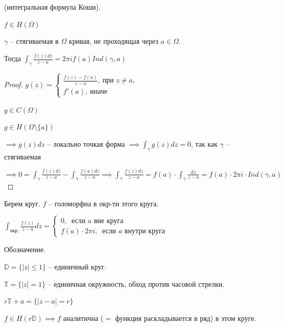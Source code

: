 \begin{theorem}
    (интегральная формула Коши).

    $f \in H(\Omega)$

    $\gamma$ -- стягиваемая в $\Omega$ кривая, не проходящая через $a \in \Omega$.

    Тогда $\int_{\gamma} { \frac{f(z) dz}{z - a} } = 2 \pi i f(a) Ind(\gamma, a)$
\end{theorem}
\begin{proof}
    $g(z) = \begin{cases}
        \frac{f(z) - f(a)}{z - a}, \ \text{при } z \not = a, \\
        f'(a), \ \text{иначе}
    \end{cases}$

    $g \in C(\Omega)$

    $g \in H(\Omega \setminus \{ a \})$

    $\implies g(z) dz$ -- локально точкая форма $\implies \int_{\gamma} {g(z) dz} = 0$, так как $\gamma$ -- стягиваемая

    $\implies 0 = \int_{\gamma} { \frac{f(z) dz}{z - a} } - \int_{\gamma} { \frac{f(a) dz}{z - a} } \implies \int_{\gamma} { \frac{f(z) dz}{z - a} } = f(a) \cdot \int_{\gamma} { \frac{dz}{z - a} } = f(a) \cdot 2 \pi i \cdot Ind(\gamma, a)$
\end{proof}
\begin{example}
    Берем круг. $f$ -- голоморфна в окр-ти этого круга.

    $\int_{\text{окр.}} { \frac{f(z)}{z - a} dz } = \begin{cases}
        0, \ \text{ если $a$ вне круга} \\
        f(a) \cdot 2 \pi i, \ \text{ если $a$ внутри круга }
    \end{cases}$
\end{example}

\begin{remark}
    Обозначение.

    $\mathbb{D} = \{ |z| \leq 1 \}$ -- единичный круг.

    $\mathbb{T} = \{ |z| = 1 \}$ -- единичная окружность, обход против часовой стрелки.

    $r\mathbb{T} + a = \{ |z - a| = r \}$
\end{remark}

\begin{theorem}
    $f \in H(r \mathbb{D}) \implies f$ аналитична ($=$ функция раскладывается в ряд) в этом круге.
\end{theorem}

